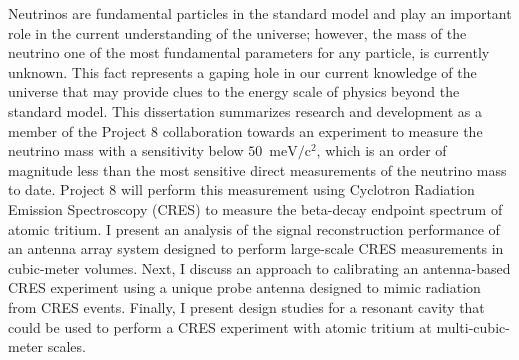 
\vspace{-0.3in}

Neutrinos are fundamental particles in the standard model and play an important role in the current understanding of the universe; however, the mass of the neutrino one of the most fundamental parameters for any particle, is currently unknown. This fact represents a gaping hole in our current knowledge of the universe that may provide clues to the energy scale of physics beyond the standard model. This dissertation summarizes research and development as a member of the Project 8 collaboration towards an experiment to measure the neutrino mass with a sensitivity below $50$~$\mathrm{meV}/\mathrm{c}^2$, which is an order of magnitude less than the most sensitive direct measurements of the neutrino mass to date. Project 8 will perform this measurement using Cyclotron Radiation Emission Spectroscopy (CRES) to measure the beta-decay endpoint spectrum of atomic tritium. I present an analysis of the signal reconstruction performance of an antenna array system designed to perform large-scale CRES measurements in cubic-meter volumes. Next, I discuss an approach to calibrating an antenna-based CRES experiment using a unique probe antenna designed to mimic radiation from CRES events. Finally, I present design studies for a resonant cavity that could be used to perform a CRES experiment with atomic tritium at multi-cubic-meter scales.